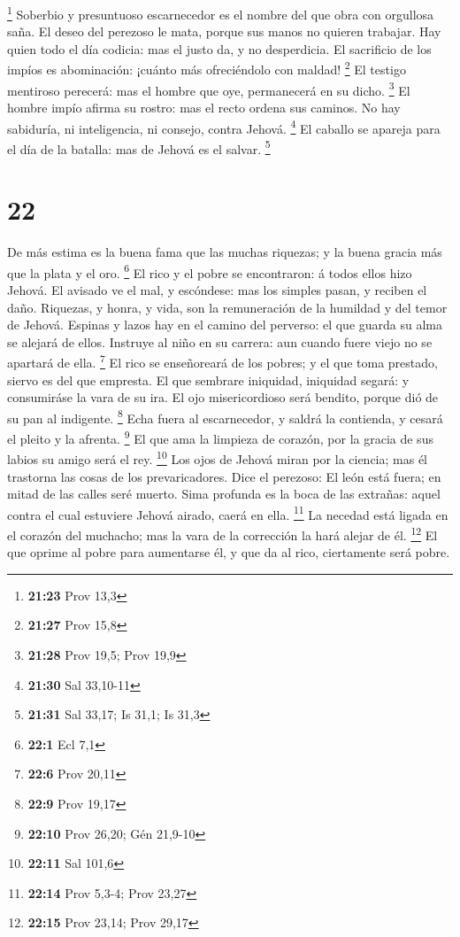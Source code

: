 \footnote{\textbf{21:23} Prov 13,3}  Soberbio y presuntuoso
escarnecedor es el nombre del que obra con orgullosa saña. 
El deseo del perezoso le mata, porque sus manos no quieren trabajar.
 Hay quien todo el día codicia: mas el justo da, y no
desperdicia.  El sacrificio de los impíos es abominación:
¡cuánto más ofreciéndolo con maldad! \footnote{\textbf{21:27} Prov 15,8}
 El testigo mentiroso perecerá: mas el hombre que oye,
permanecerá en su dicho. \footnote{\textbf{21:28} Prov 19,5; Prov 19,9}
 El hombre impío afirma su rostro: mas el recto ordena sus
caminos.  No hay sabiduría, ni inteligencia, ni consejo,
contra Jehová. \footnote{\textbf{21:30} Sal 33,10-11}  El
caballo se apareja para el día de la batalla: mas de Jehová es el
salvar. \footnote{\textbf{21:31} Sal 33,17; Is 31,1; Is 31,3}

\hypertarget{section-21}{%
\section{22}\label{section-21}}

 De más estima es la buena fama que las muchas riquezas; y
la buena gracia más que la plata y el oro. \footnote{\textbf{22:1} Ecl
  7,1}  El rico y el pobre se encontraron: á todos ellos
hizo Jehová.  El avisado ve el mal, y escóndese: mas los
simples pasan, y reciben el daño.  Riquezas, y honra, y
vida, son la remuneración de la humildad y del temor de Jehová.
 Espinas y lazos hay en el camino del perverso: el que
guarda su alma se alejará de ellos.  Instruye al niño en su
carrera: aun cuando fuere viejo no se apartará de ella. \footnote{\textbf{22:6}
  Prov 20,11}  El rico se enseñoreará de los pobres; y el
que toma prestado, siervo es del que empresta.  El que
sembrare iniquidad, iniquidad segará: y consumiráse la vara de su ira.
 El ojo misericordioso será bendito, porque dió de su pan al
indigente. \footnote{\textbf{22:9} Prov 19,17}  Echa fuera
al escarnecedor, y saldrá la contienda, y cesará el pleito y la afrenta.
\footnote{\textbf{22:10} Prov 26,20; Gén 21,9-10}  El que
ama la limpieza de corazón, por la gracia de sus labios su amigo será el
rey. \footnote{\textbf{22:11} Sal 101,6}  Los ojos de
Jehová miran por la ciencia; mas él trastorna las cosas de los
prevaricadores.  Dice el perezoso: El león está fuera; en
mitad de las calles seré muerto.  Sima profunda es la boca
de las extrañas: aquel contra el cual estuviere Jehová airado, caerá en
ella. \footnote{\textbf{22:14} Prov 5,3-4; Prov 23,27}  La
necedad está ligada en el corazón del muchacho; mas la vara de la
corrección la hará alejar de él. \footnote{\textbf{22:15} Prov 23,14;
  Prov 29,17}  El que oprime al pobre para aumentarse él, y
que da al rico, ciertamente será pobre.

